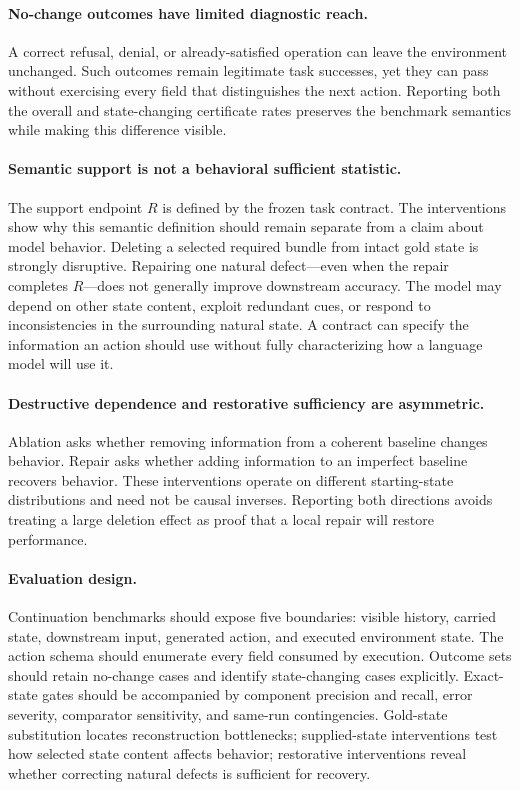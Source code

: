 \documentclass[11pt]{article}
\newcommand{\Rsupport}{R}
\begin{document}
\paragraph{No-change outcomes have limited diagnostic reach.}
A correct refusal, denial, or already-satisfied operation can leave the environment unchanged. Such outcomes remain legitimate task successes, yet they can pass without exercising every field that distinguishes the next action. Reporting both the overall and state-changing certificate rates preserves the benchmark semantics while making this difference visible.

\paragraph{Semantic support is not a behavioral sufficient statistic.}
The support endpoint \(\Rsupport\) is defined by the frozen task contract. The interventions show why this semantic definition should remain separate from a claim about model behavior. Deleting a selected required bundle from intact gold state is strongly disruptive. Repairing one natural defect---even when the repair completes \(\Rsupport\)---does not generally improve downstream accuracy. The model may depend on other state content, exploit redundant cues, or respond to inconsistencies in the surrounding natural state. A contract can specify the information an action should use without fully characterizing how a language model will use it.

\paragraph{Destructive dependence and restorative sufficiency are asymmetric.}
Ablation asks whether removing information from a coherent baseline changes behavior. Repair asks whether adding information to an imperfect baseline recovers behavior. These interventions operate on different starting-state distributions and need not be causal inverses. Reporting both directions avoids treating a large deletion effect as proof that a local repair will restore performance.

\paragraph{Evaluation design.}
Continuation benchmarks should expose five boundaries: visible history, carried state, downstream input, generated action, and executed environment state. The action schema should enumerate every field consumed by execution. Outcome sets should retain no-change cases and identify state-changing cases explicitly. Exact-state gates should be accompanied by component precision and recall, error severity, comparator sensitivity, and same-run contingencies. Gold-state substitution locates reconstruction bottlenecks; supplied-state interventions test how selected state content affects behavior; restorative interventions reveal whether correcting natural defects is sufficient for recovery.
\end{document}
